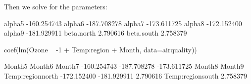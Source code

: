 Then we solve for the parameters:
\begin{Schunk}
\begin{Soutput}
                  [,1]
alpha5     -160.254743
alpha6     -187.708278
alpha7     -173.611725
alpha8     -172.152400
alpha9     -181.929911
beta.north    2.790616
beta.south    2.758379
\end{Soutput}
\begin{Sinput}
 coef(lm(Ozone ~ -1 + Temp:region + Month, data=airquality))
\end{Sinput}
\begin{Soutput}
          Month5           Month6           Month7 
     -160.254743      -187.708278      -173.611725 
          Month8           Month9 Temp:regionnorth 
     -172.152400      -181.929911         2.790616 
Temp:regionsouth 
        2.758379 
\end{Soutput}
\end{Schunk}

